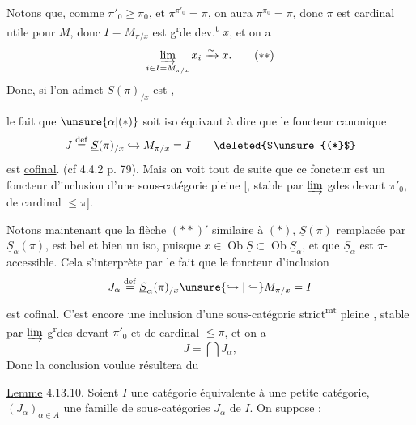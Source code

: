  Notons que, comme $\pi'_0\geq\pi_0$, et 
$\pi^{\pi'_0}=\pi$, on aura $\pi^{\pi_0}=\pi$, donc $\pi$ est
cardinal utile pour $M$, donc 
$I=M_{\pi/x}$ est g\textsuperscript{r}de dev.\textsuperscript{t} $x$, et on a
\[
\varinjlim_{i\in I=M_{\pi/x}}x_i\xrightarrow{\sim}x.\tag*{$(**)$}
\]
Donc, si l'on admet  $\underline S(\pi)_{/x}$ est ,

le fait que $\unsure{\alpha|(*)}$ soit iso équivaut à dire
que le foncteur  canonique
\[
J\overset{\mathrm{def}}{=}\underline S(\pi)_{/x}\hookrightarrow M_{\pi/x}=I
\tag*{\deleted{$\unsure{(*}$}}
\]
est \uline{cofinal}. (cf 4.4.2 p. 79). \deleted{\unsure{[}}Mais
on voit tout de suite que ce foncteur
est un foncteur d'inclusion d'une sous-catégorie  pleine [, stable par $\varinjlim$ gdes
devant $\pi'_0$, de cardinal $\leq\pi$].

Notons maintenant que la flèche
$(**)'$ similaire à $(*)$,  $\underline S(\pi)$
remplacée par $\underline S_\alpha(\pi)$, est bel et bien
un iso, puisque $x\in\operatorname{Ob}\underline S\subset\operatorname{Ob}\underline S_\alpha$,
et que $\underline S_\alpha$ est $\pi$-accessible. Cela
s'interprète par le fait que le foncteur
d'inclusion
\[
J_\alpha\overset{\mathrm{def}}{=}\underline S_\alpha(\pi)_{/x}\unsure{\hookrightarrow|\lhook\joinrel\relbar}M_{\pi/x}=I
\]
est cofinal. C'est encore une inclusion
 d'une sous-catégorie  strict\textsuperscript{mt} pleine ,
stable par $\varinjlim$ g\textsuperscript{r}des devant $\pi'_0$ et de
cardinal $\leq\pi$, et on a
\[
J=\bigcap J_\alpha,
\]
Donc la conclusion voulue résultera du

\uline{Lemme} 4.13.10. Soient 
$I$ une catégorie équivalente à une petite catégorie,
 $(J_\alpha)_{\alpha\in A}$ une famille
de sous-catégories  $J_\alpha$ de $I$. On
suppose :

